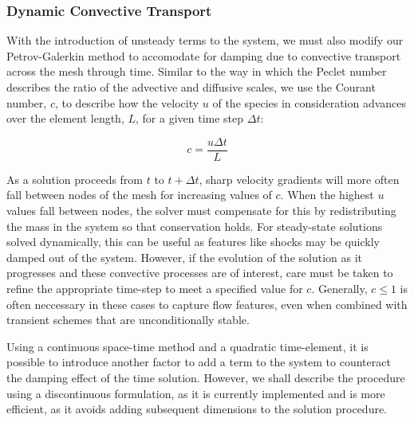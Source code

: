 \subsubsection{Dynamic Convective Transport}

With the introduction of unsteady terms to the system, we must also modify our Petrov-Galerkin method to accomodate for damping due to convective transport across the mesh through time. Similar to the way in which the Peclet number describes the ratio of the advective and diffusive scales, we use the Courant number, $c$, to describe how the velocity $u$ of the species in consideration advances over the element length, $L$, for a given time step $\Delta{t}$:

\begin{equation}
 c=\frac{u\Delta{t}}{L}
\end{equation}

As a solution proceeds from $t$ to $t+\Delta{t}$, sharp velocity gradients will more often fall between nodes of the mesh for increasing values of $c$. When the highest $u$ values fall between nodes, the solver must compensate for this by redistributing the mass in the system so that conservation holds. For steady-state solutions solved dynamically, this can be useful as features like shocks may be quickly damped out of the system. However, if the evolution of the solution as it progresses and these convective processes are of interest, care must be taken to refine the appropriate time-step to meet a specified value for $c$. Generally, $c\le{1}$ is often neccessary in these cases to capture flow features, even when combined with transient schemes that are unconditionally stable.


Using a continuous space-time method and a quadratic time-element, it is possible to introduce another factor to add a term to the system to counteract the damping effect of the time solution. However, we shall describe the procedure using a discontinuous formulation, as it is currently implemented and is more efficient, as it avoids adding subsequent dimensions to the solution procedure. 

